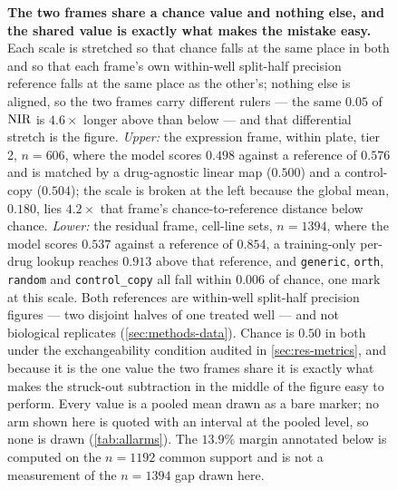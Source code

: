 \begin{figure}[htbp]
\centering

\caption[Two frames, one chance value]{\textbf{The two frames share a chance
value and nothing else, and the shared value is exactly what makes the mistake
easy.} Each scale is stretched so that chance falls at the same place in both and
so that each frame's own within-well split-half precision reference falls at the
same place as the other's; nothing else is aligned, so the two frames carry
different rulers --- the same $0.05$ of $\textrm{NIR}$ is $4.6\times$ longer above than
below --- and that differential stretch is the figure. \emph{Upper:} the
expression frame, within plate, tier 2, $n = \num{606}$, where the model scores
$0.498$ against a reference of $0.576$ and is matched by a drug-agnostic linear
map ($0.500$) and a control-copy ($0.504$); the scale is broken at the left
because the global mean, $0.180$, lies $4.2\times$ that frame's
chance-to-reference distance below chance. \emph{Lower:} the residual frame,
cell-line sets, $n = \num{1394}$, where the model scores $0.537$ against a
reference of $0.854$, a training-only per-drug lookup reaches $0.913$ above that
reference, and \texttt{generic}, \texttt{orth}, \texttt{random} and
\texttt{control\_copy} all fall within $0.006$ of chance, one mark at this scale.
Both references are within-well split-half precision figures --- two disjoint
halves of one treated well --- and not biological replicates
(\cref{sec:methods-data}). Chance is $0.50$ in both under the exchangeability
condition audited in \cref{sec:res-metrics}, and because it is the one value the
two frames share it is exactly what makes the struck-out subtraction in the
middle of the figure easy to perform. Every value is a pooled mean drawn as a
bare marker; no arm shown here is quoted with an interval at the pooled level, so
none is drawn (\cref{tab:allarms}). The $13.9\%$ margin annotated below is
computed on the $n = \num{1192}$ common support and is not a measurement of the
$n = \num{1394}$ gap drawn here.}
\label{fig:two-scales}
\end{figure}

